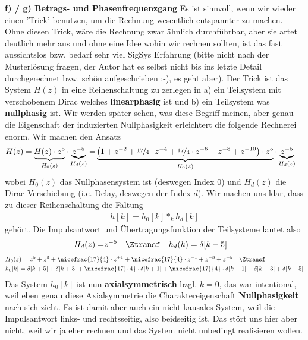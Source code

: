\textbf{f) / g) Betrags- und Phasenfrequenzgang}
Es ist sinnvoll, wenn wir wieder einen 'Trick' benutzen, um die Rechnung wesentlich
entspannter zu machen. Ohne diesen Trick, wäre die Rechnung zwar ähnlich durchführbar,
aber sie artet deutlich mehr aus und ohne eine Idee wohin wir rechnen sollten,
ist das fast aussichtslos bzw. bedarf sehr viel SigSys Erfahrung (bitte nicht nach
der Musterlösung fragen, der Autor hat es selbst nicht bis ins letzte Detail
durchgerechnet bzw. schön aufgeschrieben ;-), es geht aber).
%
Der Trick ist das System $H(z)$ in eine Reihenschaltung zu zerlegen in a)
ein Teilsystem mit verschobenem Dirac welches \textbf{linearphasig} ist
und b) ein Teilsystem was \textbf{nullphasig} ist. Wir werden später sehen,
was diese Begriff meinen, aber genau die Eigenschaft der induzierten
Nullphasigkeit erleichtert die folgende Rechnerei enorm.
%
Wir machen den Ansatz
\begin{align}
H(z) = \underbrace{H(z) \cdot z^5}_{H_0(z)} \cdot \underbrace{z^{-5}}_{H_d(z)}= &
\underbrace{\left(1 + z^{-2} + \nicefrac{17}{4}\cdot z^{-4} + \nicefrac{17}{4}\cdot z^{-6} + z^{-8} + z^{-10}\right)
\cdot z^5}_{H_0(z)} \cdot \underbrace{z^{-5}}_{H_d(z)}
\end{align}
wobei $H_0(z)$ das Nullphasensystem ist (deswegen Index $0$) und $H_d(z)$ die
Dirac-Verschiebung (i.e. Delay, deswegen der Index $d$).
Wir machen uns klar, dass zu dieser Reihenschaltung die Faltung
\begin{align}
h[k] = h_0[k] \ast_k h_d[k]
\end{align}
gehört.
%
Die Impulsantwort und Übertragungsfunktion der Teilsysteme lautet also
\begin{align}
H_d(z) =& z^{-5} \quad\Ztransf\quad h_d(k) = \delta[k-5]
\end{align}
\begin{align}
&H_0(z) = z^5 + z^3 + \nicefrac{17}{4}\cdot z^{+1} + \nicefrac{17}{4}\cdot z^{-1} + z^{-3} + z^{-5}
\quad\Ztransf\quad\nonumber\\
&h_0[k] = \delta[k+5] + \delta[k+3] + \nicefrac{17}{4}\cdot\delta[k+1] + \nicefrac{17}{4}\cdot\delta[k-1] + \delta[k-3] + \delta[k-5]
\end{align}
%
Das System $h_0[k]$ ist nun \textbf{axialsymmetrisch} bzgl. $k=0$, das war intentional, weil
eben genau diese Axialsymmetrie die Charaktereigenschaft \textbf{Nullphasigkeit}
nach sich zieht. Es ist damit aber auch ein nicht kausales System, weil die Impulsantwort
links- und rechtsseitig, also beidseitig ist. Das stört uns hier aber nicht, weil
wir ja eher rechnen und das System nicht unbedingt realisieren wollen.
